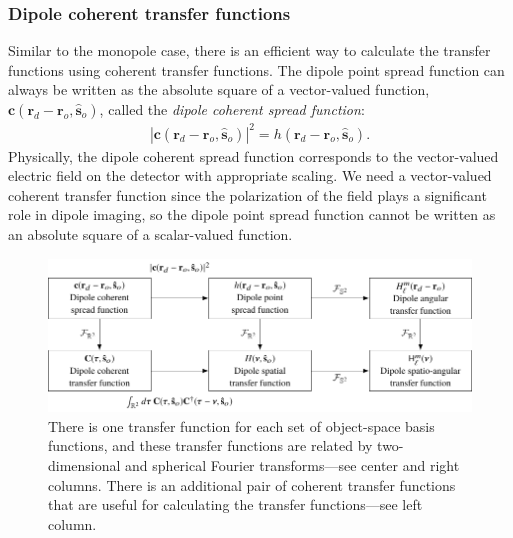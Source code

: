 \documentclass[]{osa-article}
\providecommand{\mb}[1]{\mathbf{#1}}
\providecommand{\ro}{\mathbf{\mathbf{r}}_o}
\providecommand{\so}{\mathbf{\hat{s}}_o}
\providecommand{\rd}{\mathbf{r}_d}
\begin{document}
\subsubsection{Dipole coherent transfer functions}
Similar to the monopole case, there is an efficient way to calculate the
transfer functions using coherent transfer functions. The dipole point spread
function can always be written as the absolute square of a vector-valued
function, $\mb{c}(\rd - \ro, \so)$, called the \textit{dipole coherent spread
  function}:
\begin{align}
  |\mb{c}(\rd - \ro, \so)|^2 = h(\rd - \ro, \so). \label{eq:absquare2}
\end{align}
Physically, the dipole coherent spread function corresponds to the vector-valued
electric field on the detector with appropriate scaling. We need a vector-valued
coherent transfer function since the polarization of the field plays a
significant role in dipole imaging, so the dipole point spread function cannot
be written as an absolute square of a scalar-valued function.

\begin{figure}
  \hspace{-2em}
  \includegraphics[scale=1.0]{../figures/transfer-functions/transfer-functions.pdf}
  \caption{There is one transfer function for each set of object-space basis
    functions, and these transfer functions are related by two-dimensional and
    spherical Fourier transforms---see center and right columns. There is an
    additional pair of coherent transfer functions that are useful for
    calculating the transfer functions---see left column.}
   \label{fig:transfer-functions}
 \end{figure}
    
\end{document}
